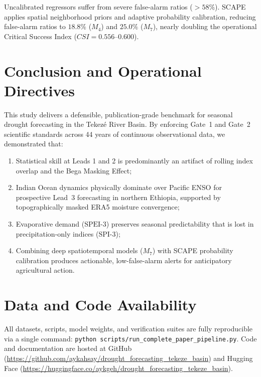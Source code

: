\documentclass{article}
\begin{document}
Uncalibrated regressors suffer from severe false-alarm ratios ($>58\%$). SCAPE applies spatial neighborhood priors and adaptive probability calibration, reducing false-alarm ratios to $18.8\%$ ($M_4$) and $25.0\%$ ($M_7$), nearly doubling the operational Critical Success Index ($CSI = 0.556$--$0.600$).

\section{Conclusion and Operational Directives}
\label{sec:conclusion}
This study delivers a defensible, publication-grade benchmark for seasonal drought forecasting in the Tekez\'{e} River Basin. By enforcing Gate~1 and Gate~2 scientific standards across 44 years of continuous observational data, we demonstrated that:
\begin{enumerate}
    \item Statistical skill at Leads 1 and 2 is predominantly an artifact of rolling index overlap and the Bega Masking Effect;
    \item Indian Ocean dynamics physically dominate over Pacific ENSO for prospective Lead~3 forecasting in northern Ethiopia, supported by topographically masked ERA5 moisture convergence;
    \item Evaporative demand ($\text{SPEI-3}$) preserves seasonal predictability that is lost in precipitation-only indices ($\text{SPI-3}$);
    \item Combining deep spatiotemporal models ($M_7$) with SCAPE probability calibration produces actionable, low-false-alarm alerts for anticipatory agricultural action.
\end{enumerate}

\section*{Data and Code Availability}
All datasets, scripts, model weights, and verification suites are fully reproducible via a single command: \texttt{python scripts/run\_complete\_paper\_pipeline.py}. Code and documentation are hosted at GitHub (\url{https://github.com/aykahsay/drought_forecasting_tekeze_basin}) and Hugging Face (\url{https://huggingface.co/aykgeh/drought_forecasting_tekeze_basin}).
\end{document}
